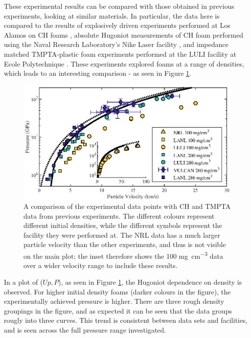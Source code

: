 These experimental results can be compared with those obtained in previous experiments, looking at similar materials. In particular, the data here is compared to the results of explosively driven experiments performed at Los Alamos on CH foams \cite{Marsh1980}, absolute Hugoniot  measurements of CH foam performed using the Naval Research Laboratory's Nike Laser facility \cite{Aglitskiy2018}, and impedance matched TMPTA-plastic foam experiments performed at the LULI facility at Ecole Polytechnique \cite{Koenig1999}. These experiments explored foams at a range of densities, which leads to an interesting comparison - as seen in Figure \ref{fig:Other Foam Data}.

\begin{figure} [h!]
\begin{centering}
\includegraphics[width=1.0\textwidth]{figures/Experiment/OtherDataUpP_wide.eps}%
\caption{\label{fig:Other Foam Data} A comparison of the experimental data points with CH and TMPTA data from previous experiments. The different colours represent different initial densities, while the different symbols represent the facility they were performed at. The NRL data has a much larger particle velocity than the other experiments, and thus is not visible on the main plot; the inset therefore shows the 100 \unit{\milli\gram\per\centi\meter\cubed} data over a wider velocity range to include these results. }
\end{centering}
\end{figure}

In a plot of ($Up,P$), as seen in Figure \ref{fig:Other Foam Data}, the Hugoniot dependence on density is observed. For higher initial density foams (darker colours in the figure), the experimentally achieved pressure is higher. There are three rough density groupings in the figure, and as expected it can be seen that the data groups rougly into three curves. This trend is consistent between data sets and facilities, and is seen across the full pressure range investigated.

